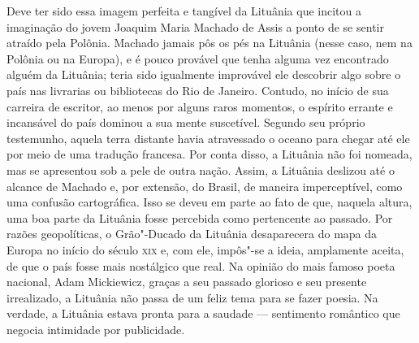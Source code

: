 Deve ter sido essa imagem perfeita e tangível da Lituânia que incitou a
imaginação do jovem Joaquim Maria Machado de Assis a ponto de se sentir
atraído pela Polônia. Machado jamais pôs os pés na Lituânia (nesse caso,
nem na Polônia ou na Europa), e é pouco provável que tenha alguma vez
encontrado alguém da Lituânia; teria sido igualmente improvável ele
descobrir algo sobre o país nas livrarias ou bibliotecas do Rio de
Janeiro. Contudo, no início de sua carreira de escritor, ao menos por
alguns raros momentos, o espírito errante e incansável do país dominou a
sua mente suscetível. Segundo seu próprio testemunho, aquela terra
distante havia atravessado o oceano para chegar até ele por meio de uma
tradução francesa. Por conta disso, a Lituânia não foi nomeada, mas se
apresentou sob a pele de outra nação. Assim, a Lituânia deslizou até o
alcance de Machado e, por extensão, do Brasil, de maneira imperceptível,
como uma confusão cartográfica. Isso se deveu em parte ao fato de que,
naquela altura, uma boa parte da Lituânia fosse percebida como
pertencente ao passado. Por razões geopolíticas, o Grão"-Ducado da
Lituânia desaparecera do mapa da Europa no início do século \textsc{xix} e,
com ele, impôs"-se a ideia, amplamente aceita, de que o país fosse mais
nostálgico que real. Na opinião do mais famoso poeta nacional, Adam
Mickiewicz, graças a seu passado glorioso e seu presente irrealizado, a
Lituânia não passa de um feliz tema para se fazer poesia. Na verdade, a
Lituânia estava pronta para a saudade --- sentimento romântico que negocia
intimidade por publicidade.

